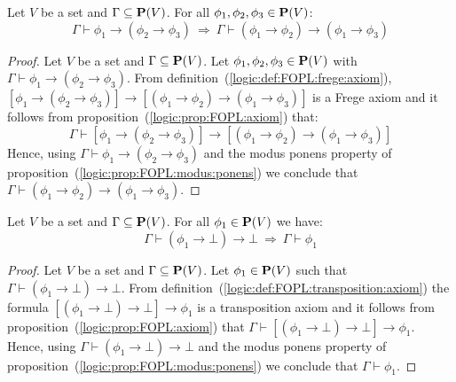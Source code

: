\begin{prop}\label{logic:prop:FOPL:Frege}
Let $V$ be a set and $\Gamma\subseteq\mbox{${\bf P}(V)$}$. For all
$\phi_{1},\phi_{2},\phi_{3}\in\mbox{${\bf P}(V)$}$:
    \[
    \Gamma\vdash\phi_{1}\to(\phi_{2}\to\phi_{3})\ \Rightarrow\
    \Gamma\vdash (\phi_{1}\to\phi_{2})\to(\phi_{1}\to\phi_{3})
    \]
\end{prop}
\begin{proof}
Let $V$ be a set and $\Gamma\subseteq\mbox{${\bf P}(V)$}$. Let
$\phi_{1},\phi_{2},\phi_{3}\in\mbox{${\bf P}(V)$}$ with
$\Gamma\vdash\phi_{1}\to(\phi_{2}\to\phi_{3})$. From
definition~(\ref{logic:def:FOPL:frege:axiom}),
$[\phi_{1}\to(\phi_{2}\to\phi_{3})]\to[(\phi_{1}\to\phi_{2})\to(\phi_{1}\to\phi_{3})]$
is a Frege axiom and it follows from
proposition~(\ref{logic:prop:FOPL:axiom}) that:
    \[
    \Gamma\vdash [\phi_{1}\to(\phi_{2}\to\phi_{3})]\to[(\phi_{1}\to\phi_{2})
    \to(\phi_{1}\to\phi_{3})]
    \]
Hence, using $\Gamma\vdash\phi_{1}\to(\phi_{2}\to\phi_{3})$ and the
modus ponens property of
proposition~(\ref{logic:prop:FOPL:modus:ponens}) we conclude that
$\Gamma\vdash(\phi_{1}\to\phi_{2})\to(\phi_{1}\to\phi_{3})$.
\end{proof}

\begin{prop}\label{logic:prop:FOPL:transposition}
Let $V$ be a set and $\Gamma\subseteq\mbox{${\bf P}(V)$}$. For all $\phi_{1}\in\mbox{${\bf P}(V)$}$
we have:
    \[
    \Gamma\vdash(\phi_{1}\to\bot)\to\bot\ \Rightarrow\
    \Gamma\vdash\phi_{1}
    \]
\end{prop}
\begin{proof}
Let $V$ be a set and $\Gamma\subseteq\mbox{${\bf P}(V)$}$. Let $\phi_{1}\in\mbox{${\bf P}(V)$}$ such
that $\Gamma\vdash(\phi_{1}\to\bot)\to\bot$. From
definition~(\ref{logic:def:FOPL:transposition:axiom}) the formula
$[(\phi_{1}\to\bot)\to\bot]\to\phi_{1}$ is a transposition axiom and
it follows from proposition~(\ref{logic:prop:FOPL:axiom}) that
$\Gamma\vdash[(\phi_{1}\to\bot)\to\bot]\to\phi_{1}$. Hence, using
$\Gamma\vdash(\phi_{1}\to\bot)\to\bot$ and the modus ponens property
of proposition~(\ref{logic:prop:FOPL:modus:ponens}) we conclude that
$\Gamma\vdash\phi_{1}$.
\end{proof}


